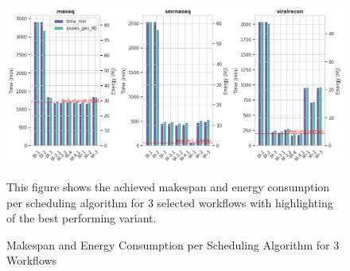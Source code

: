 \begin{figure}[H]
    \centering
    \includegraphics[scale=0.5]{fig/06/06-grouped-bar-3wfs.png}
    \small
    \caption{Makespan and Energy Consumption per Scheduling Algorithm for 3 Workflows}
    \label{fig:grouped_bar_3wfs}
    \tiny
    This figure shows the achieved makespan and energy consumption per scheduling algorithm for 3 selected workflows with highlighting of the best performing variant.
\end{figure}

